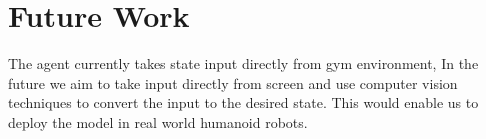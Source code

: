 \documentclass[a4paper]{article}
\begin{document}
\section*{Future Work}
The agent currently takes state input directly from gym environment, In the future we aim to take input directly from screen and use computer vision techniques to convert the input to the desired state. This would enable us to deploy the model in real world humanoid robots.




\clearpage
\end{document}
